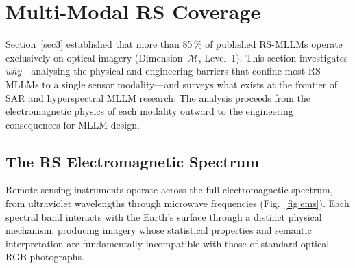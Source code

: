 
\section{Multi-Modal RS Coverage}\label{sec5}

Section~\ref{sec3} established that more than 85\,\% of published RS-MLLMs
operate exclusively on optical imagery (Dimension~$\mathcal{M}$, Level~1).
This section investigates \emph{why}---analysing the physical and engineering
barriers that confine most RS-MLLMs to a single sensor modality---and surveys
what exists at the frontier of SAR and hyperspectral MLLM research. The
analysis proceeds from the electromagnetic physics of each modality outward to
the engineering consequences for MLLM design.

\subsection{The RS Electromagnetic Spectrum}\label{sec5:spectrum}

Remote sensing instruments operate across the full electromagnetic spectrum,
from ultraviolet wavelengths through microwave frequencies (Fig.~\ref{fig:ems}).
Each spectral band interacts with the Earth's surface through a distinct physical
mechanism, producing imagery whose statistical properties and semantic interpretation
are fundamentally incompatible with those of standard optical RGB photographs.

